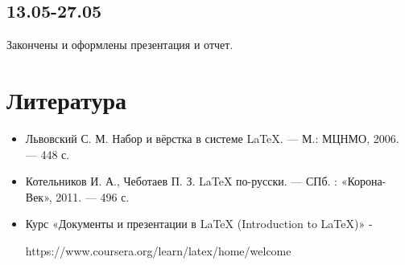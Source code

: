 \documentclass{article}
\begin{document}
	\subsection*{13.05-27.05}
	Закончены и оформлены презентация и отчет. 
	
	\section{Литература}
	
	\begin{itemize}
		\item Львовский С. М. Набор и вёрстка в системе LaTeX. — М.: МЦНМО,
		 2006. — 448 с.
		 \item Котельников И. А., Чеботаев П. З. LaTeX по-русски. — СПб. : «Корона-Век», 2011. — 496 с.
		 \item Курс «Документы и презентации в LaTeX (Introduction to LaTeX)» -
		 
		  https://www.coursera.org/learn/latex/home/welcome
	\end{itemize}
\end{document}
